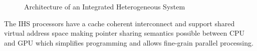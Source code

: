 \begin{figure}[!htb]
	\centering
	\def\svgwidth{0.65\columnwidth}
	
	\caption{Architecture of an Integrated Heterogeneous System}
	\label{fig:hsa-arch}
\end{figure}

\par The IHS processors have a cache coherent interconnect and support shared virtual address space making pointer sharing semantics possible between CPU and GPU which simplifies programming and allows fine-grain parallel processing.


